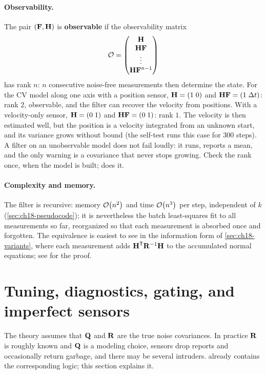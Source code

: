 \paragraph{Observability.}
The pair $(\mathbf{F},\mathbf{H})$ is \textbf{observable} if
the observability matrix
\[
  \mathcal{O}=\begin{pmatrix}\mathbf{H}\\ \mathbf{H}\mathbf{F}\\ \vdots\\ \mathbf{H}\mathbf{F}^{n-1}\end{pmatrix}
\]
has rank $n$: $n$ consecutive noise-free measurements then determine the
state. For the CV model along one axis with a position sensor, $\mathbf{H}=(1\;0)$
and $\mathbf{H}\mathbf{F}=(1\;\Delta t)$: rank $2$, observable, and the filter can
recover the velocity from positions. With a velocity-only sensor,
$\mathbf{H}=(0\;1)$ and $\mathbf{H}\mathbf{F}=(0\;1)$: rank $1$. The velocity is then
estimated well, but the position is a velocity integrated from an unknown
start, and its variance grows without bound (the self-test runs this case
for $300$ steps). A filter on an unobservable model does not fail loudly: it
runs, reports a mean, and the only warning is a covariance that never stops
growing. Check the rank once, when the model is built;
 does it.

\paragraph{Complexity and memory.}
The filter is recursive: memory $\mathcal{O}\!\left(n^2\right)$ and time $\mathcal{O}\!\left(n^3\right)$ per step,
independent of $k$ (\cref{sec:ch18-pseudocode}); it is nevertheless the batch
least-squares fit to all measurements so far, reorganized so that each
measurement is absorbed once and forgotten. The equivalence is easiest to see
in the information form of \cref{sec:ch18-variants}, where each measurement
adds $\mathbf{H}^{\mathsf{T}}\mathbf{R}^{-1}\mathbf{H}$ to the accumulated normal equations; see
\textcite[ch.~4]{sarkka2013bayesian} for the proof.

\section{Tuning, diagnostics, gating, and imperfect sensors}
\label{sec:ch18-tuning}

The theory assumes that $\mathbf{Q}$ and $\mathbf{R}$ are the true noise
covariances. In practice $\mathbf{R}$ is roughly known and $\mathbf{Q}$ is a
modeling choice, sensors drop reports and occasionally return garbage, and
there may be several intruders.  already contains the
corresponding logic; this section explains it.

